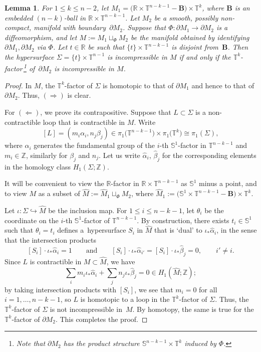 \documentclass[10pt,a4paper]{amsart}
\numberwithin{equation}{section}
\newtheorem{Lemma}[Theorem]{Lemma}
\def\R{\mathbb{R}}
\def\S{\mathbb{S}}
\def\T{\mathbb{T}}
\def\Z{\mathbb{Z}}
\def\Bb{\mathbf{B}}
\begin{document}
\begin{Lemma}\label{incprLemma}
	For $1\le k\le n-2$, let $M_1 = \big(\R\times \T^{n-k-1} - \Bb\big)\times \T^k$, where $\Bb$ is an embedded $(n-k)$-ball in $\R\times \T^{n-k-1}$.
	Let $M_2$ be a smooth, possibly non-compact, manifold with boundary~$\partial M_2$.
	Suppose that  $\Phi\colon  \partial M_1 \rightarrow \partial M_2$ is a diffeomorphism, and let
	$M:= M_1\sqcup_\Phi M_2$ be the manifold obtained by identifying $\partial M_1, \partial M_2$ via $\Phi$.
	Let $t\in \R$ be such that $\{t\}\times \T^{n-k-1}$ is disjoint from~$\Bb$.
	Then the hypersurface $\Sigma = \{t\}\times \T^{n-1}$ is incompressible in $M$
	if and only if the $\T^k$-factor\,\footnote{Note that $\partial M_2$ has the product structure $\S^{n-k-1}\times\T^k$ induced by $\Phi$.}
	of~$\partial M_2$ is incompressible in $M$.
\end{Lemma}
\begin{proof}
	In $M$, the $\T^k$-factor of $\Sigma$ is homotopic to that of $\partial M_1$ and hence to that of $\partial M_2$. Thus, $(\Rightarrow)$
	is clear.
	
	For $(\Leftarrow)$, we prove its contrapositive. Suppose that
	 $L\subset \Sigma$ is a non-contractible loop that is contractible in $M$. Write
	 \[
	 	[L] = (m_i\alpha_i, n_j\beta_j) \in\pi_1\big(\T^{n-k-1}\big)\times \pi_1\big(\T^{k}\big)\cong \pi_1(\Sigma),
	 \]
	 where $\alpha_i$ generates the fundamental group of the $i$-th $\S^1$-factor in $\T^{n-k-1}$ and $m_i\in \Z$,
	 similarly for $\beta_j$ and $n_j$.
	 Let us write $\hat\alpha_i$, $\hat \beta_j$ for the corresponding elements in the homology class $H_1(\Sigma;\Z)$.
	
	 It will be convenient to view the $\R$-factor in $\R\times \T^{n-k-1}$ as $\S^1$ minus a point, and to view
	 $M$ as a subset of $\hat M:= \hat M_1\sqcup_\Phi M_2$, where  $\hat M_1 := \bigl(\S^1\times \T^{n-k-1} - \Bb\bigr)\times \T^k$.
		
	 Let $\iota\colon \Sigma\hookrightarrow \hat M$ be the inclusion map.
	 For $1\le i\le n-k-1$, let $\theta_i$ be the coordinate on the $i$-th $\S^1$-factor of $\T^{n-k-1}$. By construction, there exists
	 $t_i\in \S^1$ such that $\theta_i = t_i$ defines a~hypersurface $S_i$ in $\hat M$ that is `dual' to $\iota_*\hat\alpha_i$, in the sense that
	 the intersection products
	 \[
	 	[S_i]\cdot \iota_*\hat \alpha_i = 1\qquad \mbox{and}\qquad  [S_i]\cdot \iota_*\hat\alpha_{i'} =[S_i]\cdot \iota_*\hat\beta_j = 0,
		\qquad i'\ne i.
	\]
	Since $L$ is contractible in $M\subset \hat M$, we have
	\[
		\sum_i m_i \iota_*\hat \alpha_i + \sum_j n_j\iota_*\hat \beta_j = 0 \in H_1(\hat M;\Z);
	\]
	by taking intersection products with $[S_i]$, we see that $m_i = 0$ for all $i = 1,\ldots, n-k-1$,
	so $L$ is homotopic to a loop in the $\T^{k}$-factor of $\Sigma$. Thus, the $\T^k$-factor of $\Sigma$
	is not incompressible in~$M$. By homotopy, the same is true for the $\T^k$-factor of $\partial M_2$.
	This completes the proof.
\end{proof}
\end{document}

